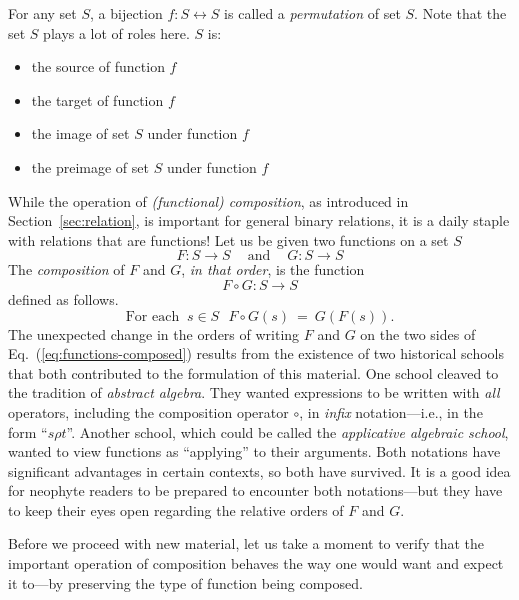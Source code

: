\smallskip

 

\noindent
For any set $S$, a bijection $f: S \leftrightarrow S$ is called a {\it permutation} of set $S$.   Note that the set $S$ plays a lot of roles here.  $S$ is:
\begin{itemize}
\item
the source of function $f$
\medskip\item
the target of function $f$
\medskip\item
the image of set $S$ under function $f$
\medskip\item
the preimage of set $S$ under function $f$
\end{itemize}


\bigskip

 
While the operation of {\it (functional) composition}, as introduced in Section~\ref{sec:relation}, is important for general binary relations, it is a daily staple with relations that are functions!  Let us be given two functions on a set $S$
\[ F: S \rightarrow S \ \ \ \ \mbox{ and } \ \ \ \ G: S \rightarrow S \]
The {\it composition} of $F$ and $G$, {\em in that order}, is the function
\[ F \circ G: S \rightarrow S \]
defined as follows.
\begin{equation}
\label{eq:functions-composed}
\mbox{For each } \ s \in S \ \ \
F \circ G(s) \ = \ G(F(s)).
\end{equation}
The unexpected change in the orders of writing $F$ and $G$ on the two sides of Eq.~(\ref{eq:functions-composed}) results from the existence of two historical schools that both contributed to the formulation of this material.  One school cleaved to the tradition of {\it abstract algebra}.  They wanted expressions to be written with {\em all} operators, including the composition operator $\circ$, in {\em infix} notation---i.e., in the form ``$s \rho t$''.  Another school, which could be called the {\it applicative algebraic school}, wanted to view functions as ``applying'' to their arguments.  Both notations have significant advantages in certain contexts, so both have survived.  It is a good idea for neophyte readers to be prepared to encounter both notations---but they have to keep their eyes open regarding the relative orders of $F$ and
$G$.  \index{composition!functions!notation}

\medskip

Before we proceed with new material, let us take a moment to verify that the important operation of composition behaves the way one would want and expect it to---by preserving the type of function being composed.

